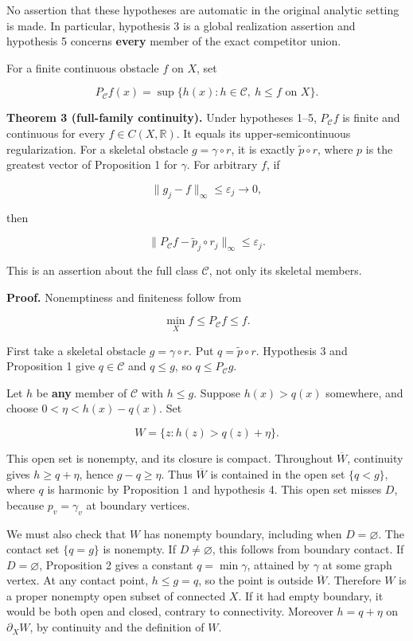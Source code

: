 \documentclass[
  11pt,
]{article}
\begin{document}
No assertion that these hypotheses are automatic in the original
analytic setting is made. In particular, hypothesis 3 is a global
realization assertion and hypothesis 5 concerns \textbf{every} member of
the exact competitor union.

For a finite continuous obstacle \(f\) on \(X\), set

\[P_{\mathcal C}f(x)=\sup\{h(x):h\in\mathcal C,\ h\leq f\text{ on }X\}.\]

\textbf{Theorem 3 (full-family continuity).} Under hypotheses 1--5,
\(P_{\mathcal C}f\) is finite and continuous for every
\(f\in C(X,\mathbb R)\). It equals its upper-semicontinuous
regularization. For a skeletal obstacle \(g=\gamma\circ r\), it is
exactly \(\widetilde p\circ r\), where \(p\) is the greatest vector of
Proposition 1 for \(\gamma\). For arbitrary \(f\), if

\[\|g_j-f\|_\infty\leq\varepsilon_j\longrightarrow0,\]

then

\[\|P_{\mathcal C}f-\widetilde p_j\circ r_j\|_\infty\leq\varepsilon_j.\]

This is an assertion about the full class \(\mathcal C\), not only its
skeletal members.

\textbf{Proof.} Nonemptiness and finiteness follow from

\[\min_X f\leq P_{\mathcal C}f\leq f.\]

First take a skeletal obstacle \(g=\gamma\circ r\). Put
\(q=\widetilde p\circ r\). Hypothesis 3 and Proposition 1 give
\(q\in\mathcal C\) and \(q\leq g\), so \(q\leq P_{\mathcal C}g\).

Let \(h\) be \textbf{any} member of \(\mathcal C\) with \(h\leq g\).
Suppose \(h(x)>q(x)\) somewhere, and choose \(0<\eta<h(x)-q(x)\). Set

\[W=\{z:h(z)>q(z)+\eta\}.\]

This open set is nonempty, and its closure is compact. Throughout
\(\overline W\), continuity gives \(h\geq q+\eta\), hence
\(g-q\geq\eta\). Thus \(\overline W\) is contained in the open set
\(\{q<g\}\), where \(q\) is harmonic by Proposition 1 and hypothesis 4.
This open set misses \(D\), because \(p_v=\gamma_v\) at boundary
vertices.

We must also check that \(W\) has nonempty boundary, including when
\(D=\varnothing\). The contact set \(\{q=g\}\) is nonempty. If
\(D\ne\varnothing\), this follows from boundary contact. If
\(D=\varnothing\), Proposition 2 gives a constant \(q=\min\gamma\),
attained by \(\gamma\) at some graph vertex. At any contact point,
\(h\leq g=q\), so the point is outside \(\overline W\). Therefore \(W\)
is a proper nonempty open subset of connected \(X\). If it had empty
boundary, it would be both open and closed, contrary to connectivity.
Moreover \(h=q+\eta\) on \(\partial_XW\), by continuity and the
definition of \(W\).
\end{document}
